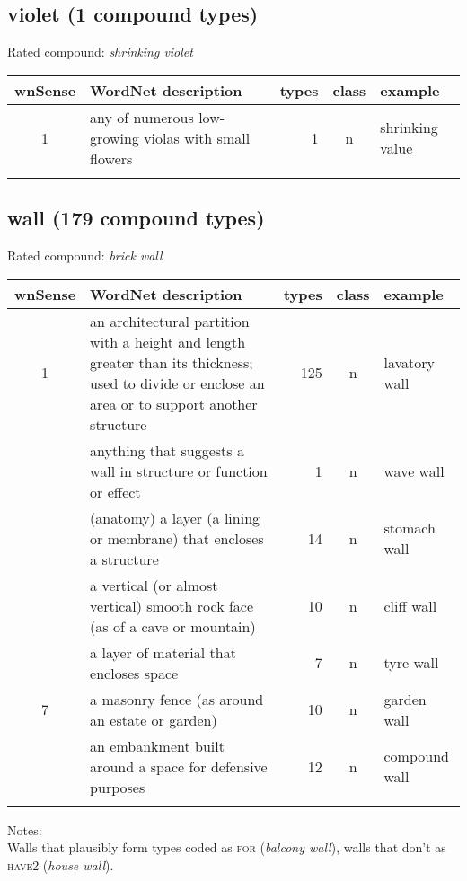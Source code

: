 \subsection{violet    (1 compound types)}
Rated compound: \emph{shrinking violet}

\vspace*{1ex}

\noindent
\begin{longtable}{c>{\raggedright\arraybackslash}p{5cm}rc>{\raggedright\arraybackslash}p{2cm}}\lsptoprule
{\small wnSense}&WordNet description&types&class&example\\\midrule
1&any of numerous low-growing violas with small flowers&1&n&shrinking value\\\lspbottomrule
\end{longtable}
\subsection{wall     (179 compound types)}
Rated compound: \emph{brick wall}

\vspace*{1ex}

\noindent
\begin{longtable}{c>{\raggedright\arraybackslash}p{5cm}rc>{\raggedright\arraybackslash}p{2cm}}\lsptoprule
{\small wnSense}&WordNet description&types&class&example\\\midrule
1&an architectural partition with a height and length greater than its thickness; used to divide or enclose an area or to support another structure&125&n&lavatory wall\\\tablevspace
2&anything that suggests a wall in structure or function or effect&1&n&wave wall\\\tablevspace
3&(anatomy) a layer (a lining or membrane) that encloses a structure&14&n&stomach wall\\\tablevspace
5&a vertical (or almost vertical) smooth rock face (as of a cave or mountain)&10&n&cliff wall\\\tablevspace
6&a layer of material that encloses space&7&n&tyre wall\\\midrule
7&a masonry fence (as around an estate or garden)&10&n&garden wall\\\tablevspace
8&an embankment built around a space for defensive purposes&12&n&compound wall\\\lspbottomrule
\end{longtable}

\noindent
Notes:\\
Walls that plausibly form types coded as \textsc{for} (\emph{balcony wall}), walls that don't as \textsc{have2} (\emph{house wall}).

